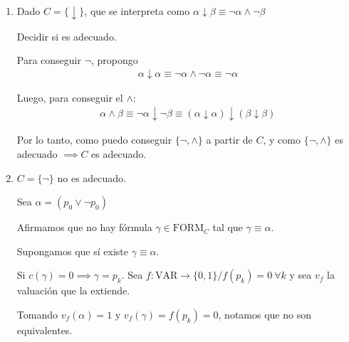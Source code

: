 \begin{enumerate}
\begin{proof}
            ¡Absurdo!
            Pues $\alpha$ es una contradicción.

            El absurdo vino de suponer que el conjunto de conectivos es
            adecuado.
            \begin{center}
            \end{center}

        \end{proof}

    \item Dado $C = \{ \downarrow \}$, que se interpreta como 
        $\alpha \downarrow \beta \equiv \neg \alpha \wedge \neg \beta$

        Decidir si es adecuado.

        Para conseguir $\neg$, propongo
        \begin{gather*}
            \alpha \downarrow \alpha \equiv
             \neg \alpha \wedge \neg \alpha \equiv
             \neg \alpha
        \end{gather*}

        Luego, para conseguir el $\wedge$:
        \begin{gather*}
            \alpha \wedge \beta \equiv
            \neg \alpha \downarrow \neg \beta \equiv
            (\alpha \downarrow \alpha) \downarrow (\beta \downarrow \beta)
        \end{gather*}

        Por lo tanto, como puedo conseguir $\{ \neg, \wedge \}$ a partir de
        $C$, y como $\{ \neg, \wedge \}$ es adecuado
        $\implies C$ es adecuado.

    \item $C = \{ \neg \}$ no es adecuado.

        Sea $\alpha = (p_0 \vee \neg p_0)$

        Afirmamos que no hay fórmula $\gamma \in \mathrm{FORM}_C$ tal que
        $\gamma \equiv \alpha$.

        Supongamos que sí existe $\gamma \equiv \alpha$.

        Si $c(\gamma) = 0 \implies \gamma = p_k$.
        Sea $f: \mathrm{VAR} \to \{ 0, 1 \} / f(p_k) = 0 ~ \forall k$ y
        sea $v_f$ la valuación que la extiende.

        Tomando $v_f (\alpha) = 1$ y $v_f (\gamma) = f(p_k) = 0$, notamos que
        no son equivalentes.
    

\end{enumerate}
